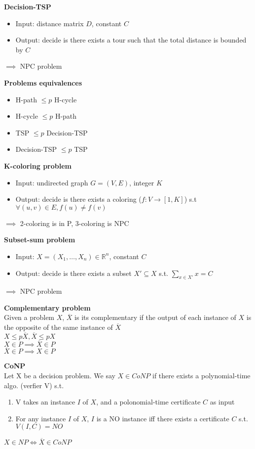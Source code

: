 \documentclass[10pt,letterpaper,landscape]{report}
\newcommand{\boxheight}{21.59cm}
\newcommand{\boxwidth}{8.85cm}
\begin{document}
\begin{small}
{\begin{minipage}[t][\boxheight][c]{\boxwidth}
	\textbf{Decision-TSP}
	\begin{itemize}
	    \item Input: distance matrix $D$, constant $C$
	    \item Output: decide is there exists a tour such that the total distance is bounded by $C$
	\end{itemize}
	$\implies$ NPC problem
	
	\textbf{Problems equivalences}
	\begin{itemize}
	    \item H-path $\leq p$ H-cycle
	    \item H-cycle $\leq p$ H-path
	    \item TSP $\leq p$ Decision-TSP
	    \item Decision-TSP $\leq p$ TSP
	\end{itemize}
	
	\textbf{K-coloring problem}
	\begin{itemize}
	    \item Input: undirected graph $G=(V,E)$, integer $K$
	    \item Output: decide is there exists a coloring ($f:V\rightarrow [1,K]$) s.t $\forall (u,v) \in E, f(u) \neq f(v)$
	\end{itemize}
	$\implies$ 2-coloring is in P, 3-coloring is NPC

    \textbf{Subset-sum problem}
    \begin{itemize}
        \item Input: $X=(X_1, \dots, X_n) \in \mathbb{R}^n$, constant $C$
        \item Output: decide is there exists a subset $X' \subseteq X$ s.t. $\sum_{x\in X'} x = C$
    \end{itemize}
    $\implies$ NPC problem
    
    \textbf{Complementary problem}\\
    Given a problem $X$, $\overline{X}$ is its complementary if the output of each instance of $X$ is the opposite of the same instance of $\overline{X}$\\
    $X \leq p \overline{X}, \overline{X} \leq p X$\\
    $X\in P \implies \overline{X} \in P$\\
    $\overline{X} \in P \implies X \in P$
    
    \textbf{CoNP}\\
    Let X be a decision problem. We say $X\in CoNP$ if there exists a polynomial-time algo. (verfier V) s.t. 
    \begin{enumerate}
        \item V takes an instance $I$ of $X$, and a polonomial-time certificate $C$ as input
        \item For any instance $I$ of $X$, $I$ is a NO instance iff there exists a certificate $C$ s.t. $V(I,C) = NO$
    \end{enumerate}
    $X\in NP \iff \overline{X} \in CoNP$
    

\end{minipage}}
\end{small}
\end{document}
